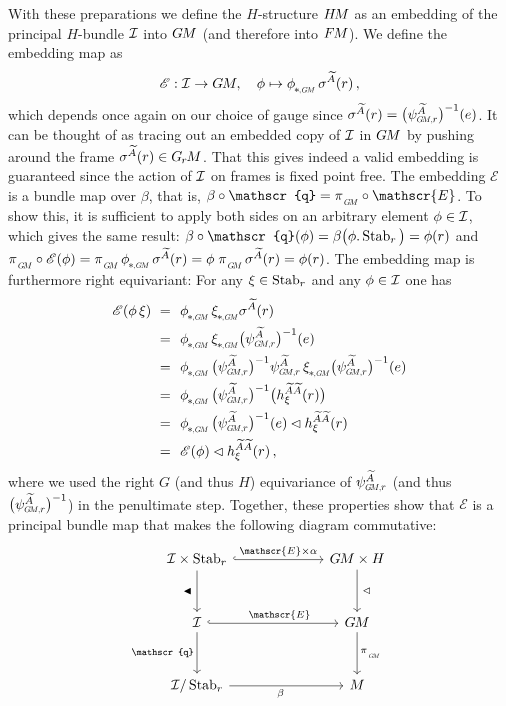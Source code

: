 With these preparations we define the $H$-structure $H\mkern-2.5muM$ as an embedding of the principal $H$-bundle $\mathcal{I}$ into $G\mkern-1.4muM$ (and therefore into $F\mkern-1.5muM$).
We define the embedding map as
\begin{align}
    \mathscr{E}: \I \to \GM,\ \ \ \phi \mapsto \dphiGM\, \sigma^{\widetilde{A}}(r) \,,
\end{align}
which depends once again on our choice of gauge since $\sigma^{\widetilde{A}}(r) = \big(\psiGMr^{\widetilde{A}}\big)^{-1}(e)$.
It can be thought of as tracing out an embedded copy of $\mathcal{I}$ in $G\mkern-1.4muM$ by pushing around the frame $\sigma^{\widetilde{A}}(r) \in G_{\mkern-1.3mu r}\mkern-1.3muM$.
That this gives indeed a valid embedding is guaranteed since the action of $\mathcal{I}$ on frames is fixed point free.
The embedding $\mathscr{E}$ is a bundle map over $\beta$, that is, $\beta\circ\mathscr{q} = \piGM \circ \mathscr{E}$.
To show this, it is sufficient to apply both sides on an arbitrary element $\phi\in\mathcal{I}$, which gives the same result:
$\beta \circ \mathscr{q} (\phi) = \beta\big( \phi.\Stab{r} \big) = \phi(r)$ and
$\piGM \circ \mathscr{E} (\phi) = \piGM\, \dphiGM\, \sigma^{\widetilde{A}}(r) = \phi\; \piGM\, \sigma^{\widetilde{A}}(r) = \phi(r)$.
The embedding map is furthermore right equivariant:
For any $\xi \in \operatorname{Stab}_{r}$ and any $\phi \in \mathcal{I}$ one has
\begin{align}
    \mathscr{E}(\phi\,\xi)
    \ =&\ \ \dphiGM\, \dxiGM \sigma^{\widetilde{A}}(r) \notag \\
    \ =&\ \ \dphiGM\, \dxiGM \big(\psiGMr^{\widetilde{A}}\big)^{-1}(e) \notag \\
    \ =&\ \ \dphiGM\, \big(\psiGMr^{\widetilde{A}}\big)^{-1} \psiGMr^{\widetilde{A}}\, \dxiGM \big(\psiGMr^{\widetilde{A}}\big)^{-1}(e) \notag \\
    \ =&\ \ \dphiGM\, \big(\psiGMr^{\widetilde{A}}\big)^{-1} \big( h_\xi^{\widetilde{A}\widetilde{A}}(r) \big) \notag \\
    \ =&\ \ \dphiGM\, \big(\psiGMr^{\widetilde{A}}\big)^{-1}(e) \lhd h_\xi^{\widetilde{A}\widetilde{A}}(r) \notag \\
    \ =&\ \ \mathscr{E}(\phi) \lhd h_\xi^{\widetilde{A}\widetilde{A}}(r) \,,
\end{align}
where we used the right $G$ (and thus $H$) equivariance of $\psiGMr^{\widetilde{A}}$ (and thus $\big(\psiGMr^{\widetilde{A}}\big)^{-1}$) in the penultimate step.
Together, these properties show that $\mathscr{E}$ is a principal bundle map that makes the following diagram commutative:
\begin{equation}\label{cd:GM_def_embedding}
\begin{tikzcd}[row sep=3.em, column sep=6.5em]
    \I \times \Stab{r}
        \arrow[r, "\mathscr{E}\times\alpha", hook]
        \arrow[d, "\blacktriangleleft\,"']
    & \GM \times H
        \arrow[d, "\,\lhd"]
    \\
    \I
        \arrow[r, pos=.55, "\mathscr{E}", hook]
        \arrow[d, "\mathscr{q}"']
    & \GM
        \arrow[d, "\piGM"]
    \\
    \I/\Stab{r}
        \arrow[r, pos=.45, "\beta"']
    & M
\end{tikzcd}
\end{equation}
